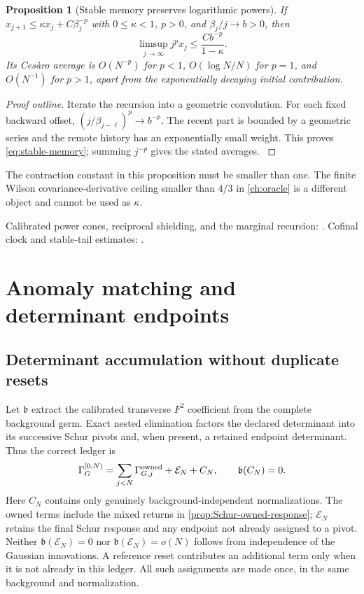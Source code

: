 \documentclass[11pt,oneside,openany]{book}
\newtheorem{proposition}[proposition]{Proposition}
\theoremstyle{definition}
\theoremstyle{remark}
\newcommand{\src}[2]{\cite[#2]{#1}}
\newcommand{\sourcebasis}[1]{\par\smallskip\noindent #1\par}
\begin{document}
\begin{proposition}[Stable memory preserves logarithmic powers]\label{prop:stable-memory}
If $x_{j+1}\le\kappa x_j+C\beta_j^{-p}$ with $0\le\kappa<1$, $p>0$, and $\beta_j/j\to b>0$, then
\begin{equation}\label{eq:stable-memory}
\limsup_{j\to\infty}j^p x_j\le\frac{Cb^{-p}}{1-\kappa}.
\end{equation}
Its Ces\`aro average is $O(N^{-p})$ for $p<1$, $O(\log N/N)$ for $p=1$, and $O(N^{-1})$ for $p>1$, apart from the exponentially decaying initial contribution.
\end{proposition}
\begin{proof}[Proof outline]
Iterate the recursion into a geometric convolution. For each fixed backward offset, $(j/\beta_{j-\ell})^p\to b^{-p}$. The recent part is bounded by a geometric series and the remote history has an exponentially small weight. This proves \cref{eq:stable-memory}; summing $j^{-p}$ gives the stated averages. \src{F11}{V1}
\end{proof}

The contraction constant in this proposition must be smaller than one. The finite Wilson covariance-derivative ceiling smaller than $4/3$ in \cref{ch:oracle} is a different object and cannot be used as $\kappa$.
\sourcebasis{Calibrated power cones, reciprocal shielding, and the marginal recursion: \src{F9}{V12--V14}. Cofinal clock and stable-tail estimates: \src{F11}{V1}.}

\chapter{Anomaly matching and determinant endpoints}
\label{ch:anomaly}
\section{Determinant accumulation without duplicate resets}
Let $\mathfrak b$ extract the calibrated transverse $F^2$ coefficient
from the complete background germ. Exact nested elimination factors
the declared determinant into its successive Schur pivots and, when
present, a retained endpoint determinant. Thus the correct ledger is
\begin{equation}\label{eq:det-telescope}
 \Gamma_G^{[0,N)}=\sum_{j<N}\Gamma_{G,j}^{\rm owned}
                   +\mathcal E_N+C_N,\qquad \mathfrak b(C_N)=0.
\end{equation}
Here $C_N$ contains only genuinely background-independent
normalizations. The owned terms include the mixed returns in
\cref{prop:Schur-owned-response}; $\mathcal E_N$ retains the final
Schur response and any endpoint not already assigned to a pivot.
Neither $\mathfrak b(\mathcal E_N)=0$ nor
$\mathfrak b(\mathcal E_N)=o(N)$ follows from independence of the
Gaussian innovations. A reference reset contributes an additional
term only when it is not already in this ledger. All such assignments
are made once, in the same background and normalization.
\end{document}
